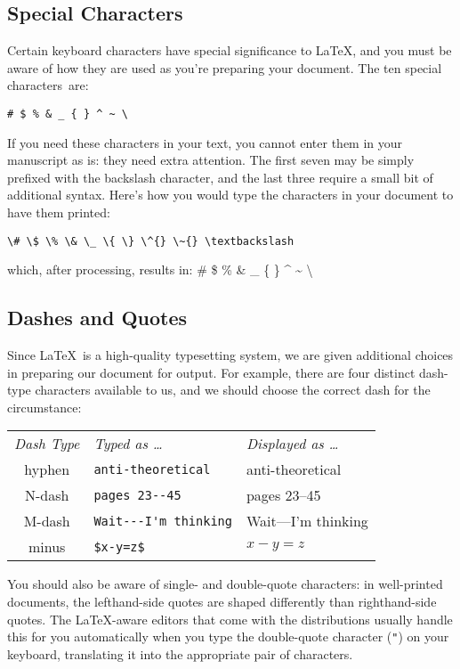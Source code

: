 \documentclass[11pt,letterpaper]{ltxdockit}[2011/03/25]
\renewcommand{\-}{\discretionary{}{}{}}
\begin{document}
\subsection{Special Characters}
\label{sec:special}
Certain keyboard characters have special significance to \LaTeX, and
you must be aware of how they are used as you're preparing your
document.  The ten special characters~are:
\begin{verbatim}
# $ % & _ { } ^ ~ \
\end{verbatim}
If you need these characters in your text, you cannot enter them in
your manuscript as is: they need extra attention.  The first seven may
be simply prefixed with the backslash character, and the last three
require a small bit of additional syntax.  Here's how you would type
the characters in your document to have them printed:
\begin{verbatim}
\# \$ \% \& \_ \{ \} \^{} \~{} \textbackslash
\end{verbatim}
which, after processing, results in: \# \$ \% \& \_ \{ \} \^{} \~{} \textbackslash

\subsection{Dashes and Quotes}
Since \LaTeX\ is a high-quality typesetting system, we are given
additional choices in preparing our document for output.  For example,
there are four distinct dash-type
characters available to us, and we
should choose the correct dash for the circumstance:
\begin{center}
\begin{tabular}{c l l}
\textit{Dash Type}&\textit{Typed as \ldots}&\textit{Displayed as \ldots}\\[3pt]
hyphen & \verb|anti-theoretical| & anti-theoretical \\
N-dash & \verb|pages 23--45| & pages 23--45 \\
M-dash & \verb|Wait---I'm thinking| & Wait---I'm thinking \\
minus & \verb|$x-y=z$| & $x-y=z$ \\
\end{tabular}
\end{center}

You should also be aware of single- and double-quote characters: in
well-printed documents, the lefthand-side quotes are shaped differently than righthand-side quotes.  The
\LaTeX-aware editors that come with the distributions usually handle
this for you automatically when you type the double-quote character
(\texttt{"}) on your keyboard, translating it into the appropriate
pair of characters.
\end{document}
